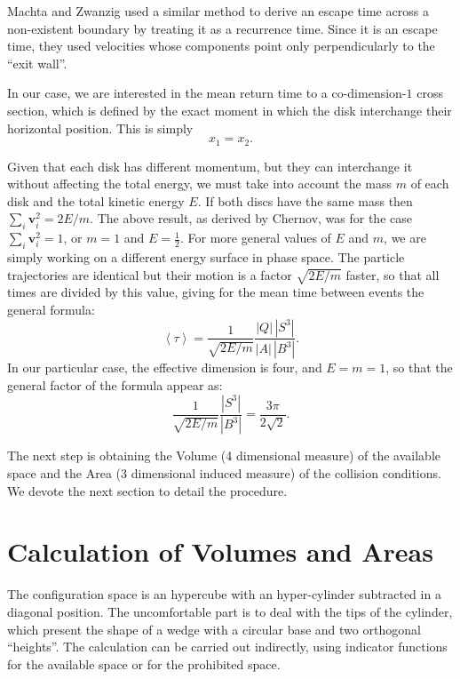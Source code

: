 \documentclass[a4paper,10pt, jcp, aps, preprint]{revtex4-1}
\newcommand{\mean}[1]{\left \langle #1 \right \rangle}
\newcommand{\vv}{\mathbf{v}}
\begin{document}
Machta and Zwanzig \cite{MachtaZwan} used a similar method to derive an escape 
time across a non-existent boundary by treating it as a recurrence time.
Since it is an escape time, they used velocities whose components point only 
perpendicularly to the ``exit wall''.

In our case, we are interested in the mean return time to 
a co-dimension-$1$ cross section, 
which is defined by the exact moment
in which the disk interchange their horizontal position. This is simply
\begin{equation} \label{condchoque}
x_1 = x_2.
\end{equation}

Given that each disk has different momentum, but
they can interchange it without affecting the
total energy, we must take into account the mass $m$ of each disk 
and the total kinetic energy $E$.
If both discs have the same mass then $\sum_i \vv_i^2 = 2E / m$.
The above result, as derived by Chernov, 
was for the case $\sum_i \vv_i^2 = 1$, or $m=1$ and $E=\frac{1}{2}$.  
For more general values of $E$ and $m$, 
we are simply working on a different energy surface in phase space. 
The particle trajectories are identical but their motion is a factor
$\sqrt{2E/m}$ faster, so that all times are divided by this value, 
giving for
the mean time between events the general formula:
\begin{equation} \label{meantimegeneral}
  \mean{\tau} =  \frac{1}{\sqrt{2E / m}} 
\frac{|Q| \, |S^3|} {|A| \, |B^3|}.	
\end{equation}
In our particular case, the effective dimension is four,
and $E=m=1$, so that the general factor of the formula appear as:
\begin{equation} \label{meantimegeneralredux}
   \frac{1}{\sqrt{2E / m}} 
\frac{|S^3|}{|B^3|}=\frac{3\pi}{2\sqrt{2}}.	 
\end{equation}

The next step is obtaining the Volume (4 dimensional measure) of
the available space and the Area (3 dimensional induced measure) of
the collision conditions. We devote the next section to
detail the procedure.


\section{Calculation of Volumes and Areas}

The configuration
space is an hypercube with an hyper-cylinder subtracted in a diagonal position.
The uncomfortable part is to deal with the tips of the cylinder, which
present the  shape of a wedge with a circular base and two 
orthogonal ``heights''. 
The calculation can be carried out indirectly, using indicator functions for the
available space or for the  prohibited space.
\end{document}
